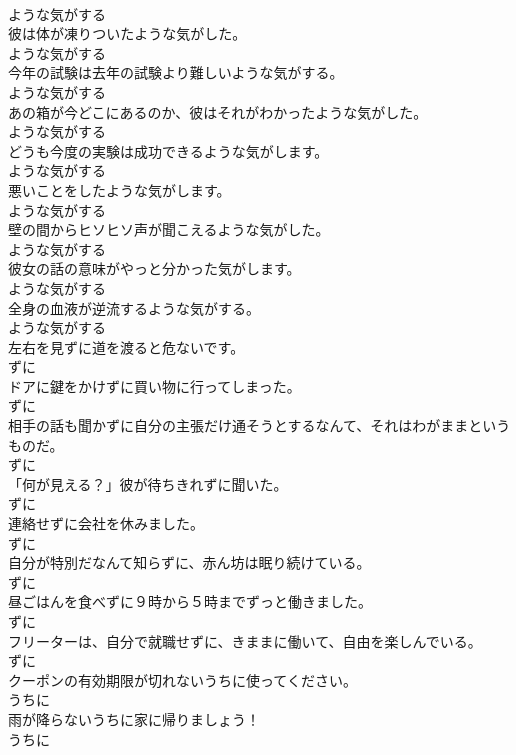 \documentclass[8pt]{extreport}
\begin{document}
\begin{CJK}{UTF8}{min}
\\	ような気がする
\\	彼は体が凍りついたような気がした。	
\\	ような気がする
\\	今年の試験は去年の試験より難しいような気がする。	
\\	ような気がする
\\	あの箱が今どこにあるのか、彼はそれがわかったような気がした。	
\\	ような気がする
\\	どうも今度の実験は成功できるような気がします。	
\\	ような気がする
\\	悪いことをしたような気がします。	
\\	ような気がする
\\	壁の間からヒソヒソ声が聞こえるような気がした。	
\\	ような気がする
\\	彼女の話の意味がやっと分かった気がします。	
\\	ような気がする
\\	全身の血液が逆流するような気がする。	
\\	ような気がする
\\	左右を見ずに道を渡ると危ないです。	
\\	ずに
\\	ドアに鍵をかけずに買い物に行ってしまった。	
\\	ずに
\\	相手の話も聞かずに自分の主張だけ通そうとするなんて、それはわがままというものだ。	
\\	ずに
\\	「何が見える？」彼が待ちきれずに聞いた。	
\\	ずに
\\	連絡せずに会社を休みました。	
\\	ずに
\\	自分が特別だなんて知らずに、赤ん坊は眠り続けている。	
\\	ずに
\\	昼ごはんを食べずに９時から５時までずっと働きました。	
\\	ずに
\\	フリーターは、自分で就職せずに、きままに働いて、自由を楽しんでいる。	
\\	ずに
\\	クーポンの有効期限が切れないうちに使ってください。	
\\	うちに
\\	雨が降らないうちに家に帰りましょう！	
\\	うちに

\end{CJK}
\end{document}
